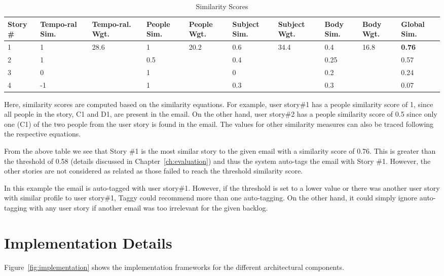 \begin{table}[h!]
  \centering
  \caption{Similarity Scores}
    \begin{tabular}{|p{1.2cm}|p{1.5cm}|p{1.2cm}|p{1.2cm}|p{1.2cm}|p{1.4cm}|p{1.4cm}|p{1.1cm}|p{1.1cm}|p{1.2cm}|}
      	\hline
		\textbf{Story \#} & \textbf{Tempo-ral Sim.} & \textbf{Tempo-ral. Wgt.} & \textbf{People Sim.} & \textbf{People Wgt.} & \textbf{Subject Sim.} &\textbf{Subject Wgt.} & \textbf{Body Sim.} &\textbf{Body Wgt.} &\textbf{Global Sim.}\\
		\hline
		1 & 1 	& \multirow{4}{*}{28.6} & 1 	& \multirow{4}{*}{20.2}	& 0.6 & \multirow{4}{*}{34.4}	& 0.4 & \multirow{4}{*}{16.8}	& \textbf{0.76}\\
		2 & 1 	&  & 0.5 	&  	& 0.4 	&	& 0.25	&	& 0.57\\
		3 & 0 	&  & 1 		& 	& 0 		& & 0.2	&	& 0.24\\
		4 & -1 	&  & 1 		& 	& 0.3 	& & 0.3	&	& 0.07\\
		\hline
	\end{tabular}
	\label{tab:similarity}
\end{table}  

Here, similarity scores are computed based on the similarity equations. For example, user story\#1 has a people similarity score of 1, since all people in the story, C1 and D1, are present in the email. On the other hand, user story\#2 has a people similarity score of 0.5 since only one (C1) of the two people from the user story is found in the email. The values for other similarity measures can also be traced following the respective equations.

From the above table we see that Story \#1 is the most similar story to the given email with a similarity score of 0.76. This is greater than the threshold of 0.58 (details discussed in Chapter~\ref{ch:evaluation}) and thus the system auto-tags the email with Story \#1. However, the other stories are not considered as related as those failed to reach the threshold similarity score.

In this example the email is auto-tagged with user story\#1. However, if the threshold is set to a lower value or there was another user story with similar profile to user story\#1, Taggy could recommend more than one auto-tagging. On the other hand, it could simply ignore auto-tagging with any user story if another email was too irrelevant for the given backlog.

\section{Implementation Details}
Figure~\ref{fig:implementation} shows the implementation frameworks for the different architectural components.

